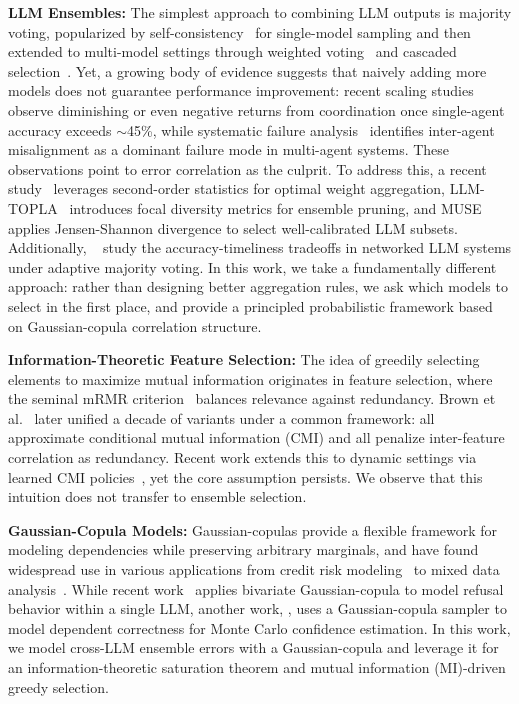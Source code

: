 \documentclass{article}
\theoremstyle{plain}
\theoremstyle{definition}
\theoremstyle{remark}
\begin{document}
\noindent\textbf{LLM Ensembles:} The simplest approach to combining LLM outputs is majority voting, popularized by self-consistency~\citep{wang2023selfconsistencyimproveschainthought} for single-model sampling and then extended to multi-model settings through weighted voting~\citep{llm-synergy,llm-blender} and cascaded selection~\citep{chen2024frugalGPT}. Yet, a growing body of evidence suggests that naively adding more models does not guarantee performance improvement: recent scaling studies~\citep{scalingagents} observe diminishing or even negative returns from coordination once single-agent accuracy exceeds $\sim$45\%, while systematic failure  analysis~\citep{cemri2025multiagentllmsystemsfail} identifies inter-agent misalignment as a 
dominant failure mode in multi-agent systems.
These observations point to error correlation as the culprit. To address this, a recent study~\citep{beyond-majority} leverages second-order 
statistics for optimal weight aggregation, LLM-TOPLA~\citep{topla} introduces focal diversity metrics for ensemble pruning, and MUSE~\citep{muse} applies Jensen-Shannon divergence to select well-calibrated LLM subsets. Additionally, ~\citep{turkmen2025balancing} study the accuracy-timeliness tradeoffs in networked LLM systems under adaptive majority voting. In this work, we take a fundamentally different approach: rather than designing better aggregation rules, we ask which models to select in the first place, and provide a principled probabilistic framework based on Gaussian-copula correlation structure.

\noindent\textbf{Information-Theoretic Feature Selection:} The idea of greedily selecting elements to maximize mutual information originates in feature selection, where the seminal mRMR criterion~\citep{peng2005} balances relevance against redundancy. Brown et al.~\citep{brown2012} later unified a decade of variants 
under a common framework: all approximate conditional mutual information (CMI) and all penalize inter-feature correlation as redundancy.
Recent work extends this to dynamic settings via learned CMI 
policies~\citep{covert2023,gadgil2024estimating}, yet the core assumption persists.
We observe that this intuition does not transfer to ensemble selection.

\noindent\textbf{Gaussian-Copula Models:} Gaussian-copulas provide a flexible framework for modeling dependencies 
while preserving arbitrary marginals, and have found widespread use in various applications from 
credit risk modeling~\citep{li2000default} to mixed data 
analysis~\citep{nelsen2007introduction}. While recent work~\citep{pan2025llmsrefusequestionsknow}
applies bivariate Gaussian-copula 
to model refusal behavior within a single LLM, another work, \cite{elumar2025costaware}, uses a Gaussian-copula sampler to model dependent correctness for Monte Carlo confidence estimation. In this work, we model cross-LLM ensemble errors with a Gaussian-copula and leverage it for an information-theoretic saturation theorem and 
mutual information (MI)-driven greedy selection.
\end{document}
